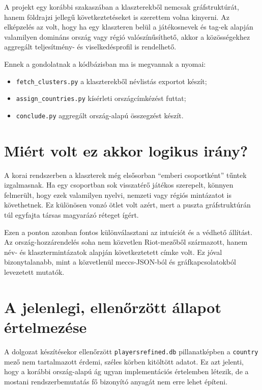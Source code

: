 \documentclass[a4paper,12pt]{report}
\begin{document}
A projekt egy korábbi szakaszában a klaszterekből nemcsak gráfstruktúrát, hanem földrajzi jellegű következtetéseket is szerettem volna kinyerni. Az elképzelés az volt, hogy ha egy klaszteren belül a játékosnevek és tag-ek alapján valamilyen domináns ország vagy régió valószínűsíthető, akkor a közösségekhez aggregált teljesítmény- és viselkedésprofil is rendelhető.

Ennek a gondolatnak a kódbázisban ma is megvannak a nyomai:

\begin{itemize}
    \item \texttt{fetch\_clusters.py} a klaszterekből névlistás exportot készít;
    \item \texttt{assign\_countries.py} kísérleti országcímkézést futtat;
    \item \texttt{conclude.py} aggregált ország-alapú összegzést készít.
\end{itemize}

\section{Miért volt ez akkor logikus irány?}

A korai rendszerben a klaszterek még elsősorban ``emberi csoportként'' tűntek izgalmasnak. Ha egy csoportban sok visszatérő játékos szerepelt, könnyen felmerült, hogy ezek valamilyen nyelvi, nemzeti vagy régiós mintázatot is követhetnek. Ez különösen vonzó ötlet volt azért, mert a puszta gráfstruktúrán túl egyfajta társas magyarázó réteget ígért.

Ezen a ponton azonban fontos különválasztani az intuíciót és a védhető állítást. Az ország-hozzárendelés soha nem közvetlen Riot-mezőből származott, hanem név- és klasztermintázatok alapján következtetett címke volt. Ez jóval bizonytalanabb, mint a közvetlenül meccs-JSON-ból és gráfkapcsolatokból levezetett mutatók.

\section{A jelenlegi, ellenőrzött állapot értelmezése}

A dolgozat készítésekor ellenőrzött \texttt{playersrefined.db} pillanatképben a \texttt{country} mező nem tartalmazott érdemi, széles körben kitöltött adatot. Ez azt jelenti, hogy a korábbi ország-alapú ág ugyan implementációs értelemben létezik, de a mostani rendszerbemutatás fő bizonyító anyagát nem erre lehet építeni.
\end{document}
